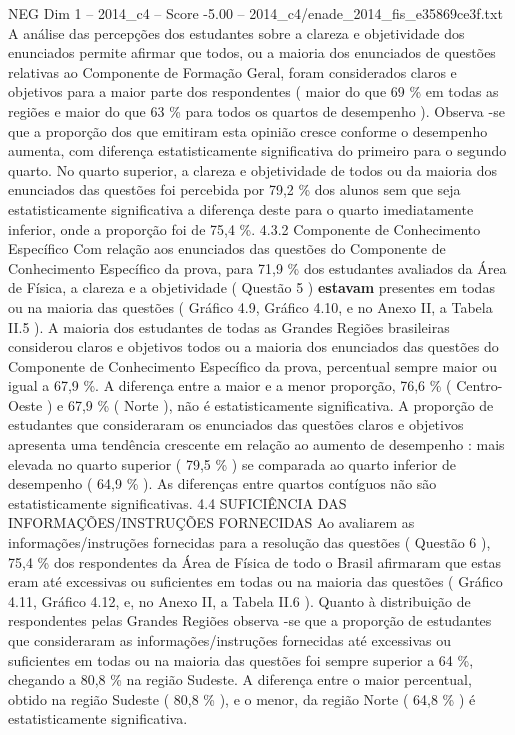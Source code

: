 \begin{textsample}{NEG Dim 1 – 2014\_c4 – Score -5.00 – 2014\_c4/enade\_2014\_fis\_e35869ce3f.txt}
A análise das percepções dos estudantes sobre a clareza e objetividade dos enunciados permite afirmar que todos, ou a maioria dos enunciados de questões relativas ao Componente de Formação Geral, foram considerados claros e objetivos para a maior parte dos respondentes ( maior do que 69 \% em todas as regiões e maior do que 63 \% para todos os quartos de desempenho ).
Observa -se que a proporção dos que emitiram esta opinião cresce conforme o desempenho aumenta, com diferença estatisticamente significativa do primeiro para o segundo quarto.
No quarto superior, a clareza e objetividade de todos ou da maioria dos enunciados das questões foi percebida por 79,2 \% dos alunos sem que seja estatisticamente significativa a diferença deste para o quarto imediatamente inferior, onde a proporção foi de 75,4 \%. 4.3.2 Componente de Conhecimento Específico Com relação aos enunciados das questões do Componente de Conhecimento Específico da prova, para 71,9 \% dos estudantes avaliados da Área de Física, a clareza e a objetividade ( Questão 5 ) \textbf{estavam} presentes em todas ou na maioria das questões ( Gráfico 4.9, Gráfico 4.10, e no Anexo II, a Tabela II.5 ).
A maioria dos estudantes de todas as Grandes Regiões brasileiras considerou claros e objetivos todos ou a maioria dos enunciados das questões do Componente de Conhecimento Específico da prova, percentual sempre maior ou igual a 67,9 \%.
A diferença entre a maior e a menor proporção, 76,6 \% ( Centro-Oeste ) e 67,9 \% ( Norte ), não é estatisticamente significativa.
A proporção de estudantes que consideraram os enunciados das questões claros e objetivos apresenta uma tendência crescente em relação ao aumento de desempenho : mais elevada no quarto superior ( 79,5 \% ) se comparada ao quarto inferior de desempenho ( 64,9 \% ).
As diferenças entre quartos contíguos não são estatisticamente significativas. 4.4 SUFICIÊNCIA DAS INFORMAÇÕES/INSTRUÇÕES FORNECIDAS Ao avaliarem as informações/instruções fornecidas para a resolução das questões ( Questão 6 ), 75,4 \% dos respondentes da Área de Física de todo o Brasil afirmaram que estas eram até excessivas ou suficientes em todas ou na maioria das questões ( Gráfico 4.11, Gráfico 4.12, e, no Anexo II, a Tabela II.6 ).
Quanto à distribuição de respondentes pelas Grandes Regiões observa -se que a proporção de estudantes que consideraram as informações/instruções fornecidas até excessivas ou suficientes em todas ou na maioria das questões foi sempre superior a 64 \%, chegando a 80,8 \% na região Sudeste.
A diferença entre o maior percentual, obtido na região Sudeste ( 80,8 \% ), e o menor, da região Norte ( 64,8 \% ) é estatisticamente significativa.

\end{textsample}
